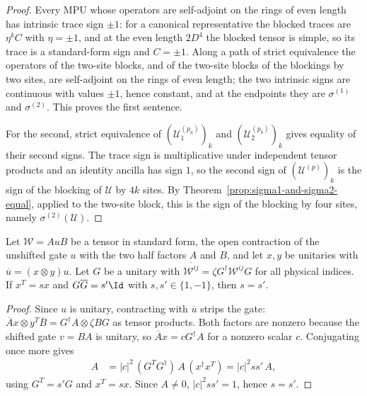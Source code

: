 \begin{proof}\leanok
    Every MPU whose operators are self-adjoint on the rings of even length has
    intrinsic trace sign $\pm1$: for a canonical representative the blocked
    traces are $\eta^kC$ with $\eta=\pm1$, and at the even length $2D^4$ the
    blocked tensor is simple, so its trace is a standard-form sign and
    $C=\pm1$. Along a path of strict equivalence the operators of the
    two-site blocks, and of the two-site blocks of the blockings by two sites,
    are self-adjoint on the rings of even length; the two intrinsic signs are
    continuous with values $\pm1$, hence constant, and at the endpoints they
    are $\sigma^{(1)}$ and $\sigma^{(2)}$. This proves the first sentence.

    For the second, strict equivalence of
    $(\mathcal U_1^{(p_a)})_k$ and $(\mathcal U_2^{(p_b)})_k$ gives equality of
    their second signs. The trace sign is multiplicative under independent
    tensor products and an identity ancilla has sign $1$, so the second sign of
    $(\mathcal U^{(p)})_k$ is the sign of the blocking of $\mathcal U$ by $4k$
    sites. By Theorem~\ref{prop:sigma1-and-sigma2-equal}, applied to the
    two-site block, this is the sign of the blocking by four sites, namely
    $\sigma^{(2)}(\mathcal U)$.
\end{proof}

\begin{lemma}
    \label{lem:mpu_conjugation_mps_sign_local}
    \leanok
    Let $\mathcal W=AuB$ be a tensor in standard form, the open contraction of
    the unshifted gate $u$ with the two half factors $A$ and $B$, and let
    $x,y$ be unitaries with $\overline u=(x\otimes y)u$. Let $G$ be a unitary
    with $\overline{\mathcal W^{ij}}=\zeta G^\dagger\mathcal W^{ij}G$ for all
    physical indices. If $x^T=sx$ and $G\overline G=s'\Id$ with
    $s,s'\in\{1,-1\}$, then $s=s'$.
\end{lemma}

\begin{proof}
    \leanok
    Since $u$ is unitary, contracting with $\overline u$ strips the gate:
    $\overline A x\otimes y^T\overline B=G^\dagger A\otimes\zeta BG$ as tensor
    products. Both factors are nonzero because the shifted gate $v=BA$ is
    unitary, so $\overline Ax=cG^\dagger A$ for a nonzero scalar $c$.
    Conjugating once more gives
    \begin{align}
        A & =|c|^2\,(G^TG^\dagger)\,A\,(x^\dagger x^T)=|c|^2ss'\,A,
    \end{align}
    using $G^T=s'G$ and $x^T=sx$. Since $A\neq0$, $|c|^2ss'=1$, hence $s=s'$.
\end{proof}

